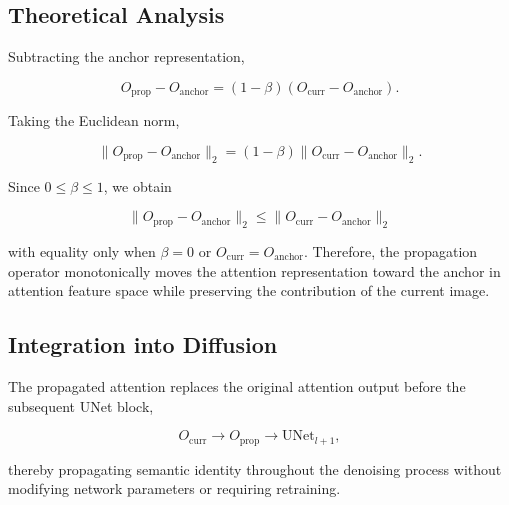 \documentclass[12pt]{article}
\begin{document}
\subsection{Theoretical Analysis}

Subtracting the anchor representation,

\begin{equation}
O_{\mathrm{prop}} - O_{\mathrm{anchor}} = (1 - \beta) \left( O_{\mathrm{curr}} - O_{\mathrm{anchor}} \right).
\tag{21}
\end{equation}

Taking the Euclidean norm,

\begin{equation}
\| O_{\mathrm{prop}} - O_{\mathrm{anchor}} \|_2 = (1 - \beta) \| O_{\mathrm{curr}} - O_{\mathrm{anchor}} \|_2.
\tag{22}
\end{equation}

Since $0 \le \beta \le 1$, we obtain

\begin{equation}
\boxed{ \| O_{\mathrm{prop}} - O_{\mathrm{anchor}} \|_2 \le \| O_{\mathrm{curr}} - O_{\mathrm{anchor}} \|_2 }
\tag{23}
\end{equation}

with equality only when $\beta = 0$ or $O_{\mathrm{curr}} = O_{\mathrm{anchor}}$. Therefore, the propagation operator monotonically moves the attention representation toward the anchor in attention feature space while preserving the contribution of the current image.

\subsection{Integration into Diffusion}

The propagated attention replaces the original attention output before the subsequent UNet block,

\begin{equation}
O_{\mathrm{curr}} \longrightarrow O_{\mathrm{prop}} \longrightarrow \text{UNet}_{l+1},
\tag{24}
\end{equation}

thereby propagating semantic identity throughout the denoising process without modifying network parameters or requiring retraining.

\newpage
\end{document}
